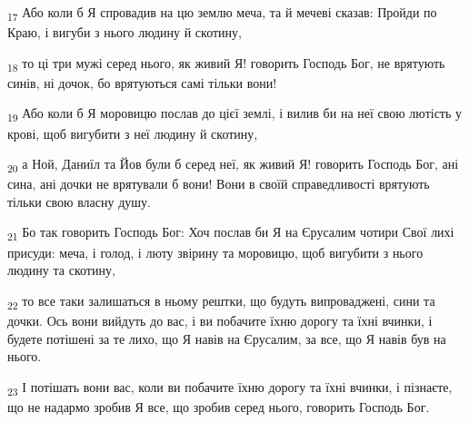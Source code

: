 \begin{tcolorbox}
\textsubscript{17} Або коли б Я спровадив на цю землю меча, та й мечеві сказав: Пройди по Краю, і вигуби з нього людину й скотину,
\end{tcolorbox}
\begin{tcolorbox}
\textsubscript{18} то ці три мужі серед нього, як живий Я! говорить Господь Бог, не врятують синів, ні дочок, бо врятуються самі тільки вони!
\end{tcolorbox}
\begin{tcolorbox}
\textsubscript{19} Або коли б Я моровицю послав до цієї землі, і вилив би на неї свою лютість у крові, щоб вигубити з неї людину й скотину,
\end{tcolorbox}
\begin{tcolorbox}
\textsubscript{20} а Ной, Даниїл та Йов були б серед неї, як живий Я! говорить Господь Бог, ані сина, ані дочки не врятували б вони! Вони в своїй справедливості врятують тільки свою власну душу.
\end{tcolorbox}
\begin{tcolorbox}
\textsubscript{21} Бо так говорить Господь Бог: Хоч послав би Я на Єрусалим чотири Свої лихі присуди: меча, і голод, і люту звірину та моровицю, щоб вигубити з нього людину та скотину,
\end{tcolorbox}
\begin{tcolorbox}
\textsubscript{22} то все таки залишаться в ньому рештки, що будуть випроваджені, сини та дочки. Ось вони вийдуть до вас, і ви побачите їхню дорогу та їхні вчинки, і будете потішені за те лихо, що Я навів на Єрусалим, за все, що Я навів був на нього.
\end{tcolorbox}
\begin{tcolorbox}
\textsubscript{23} І потішать вони вас, коли ви побачите їхню дорогу та їхні вчинки, і пізнаєте, що не надармо зробив Я все, що зробив серед нього, говорить Господь Бог.
\end{tcolorbox}
